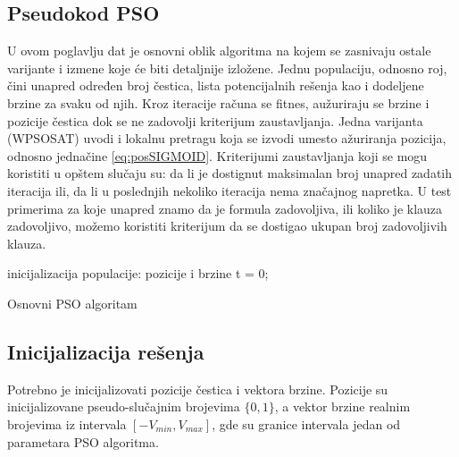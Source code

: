 \documentclass{article}
\begin{document}
 
\subsection{Pseudokod PSO}
\label{sec:pso_pseudokod}

U ovom poglavlju dat je osnovni oblik algoritma na kojem se zasnivaju ostale varijante i izmene koje će biti detaljnije izložene. Jednu populaciju, odnosno roj, čini unapred određen broj čestica, lista potencijalnih rešenja kao i dodeljene brzine za svaku od njih. 
Kroz iteracije računa se fitnes, aužuriraju se brzine i pozicije čestica dok se ne zadovolji kriterijum zaustavljanja. 
Jedna varijanta (WPSOSAT) uvodi i lokalnu pretragu koja se izvodi umesto ažuriranja pozicija, odnosno jednačine \ref{eq:posSIGMOID}.
Kriterijumi zaustavljanja koji se mogu koristiti u opštem slučaju su: da li je dostignut maksimalan broj unapred zadatih iteracija ili, da li u poslednjih nekoliko iteracija nema značajnog napretka.
U test primerima za koje unapred znamo da je formula zadovoljiva, ili koliko je klauza zadovoljivo, možemo koristiti kriterijum da se dostigao ukupan broj zadovoljivih klauza. \\

\begin{algorithm}[H]
\SetAlgoLined
{}

\BlankLine
 inicijalizacija populacije: pozicije i brzine\;
 t = 0; \\
\caption{Osnovni PSO algoritam}
\end{algorithm}


\subsection{Inicijalizacija rešenja}
\label{sec:pso_init}

Potrebno je inicijalizovati pozicije čestica i vektora brzine. Pozicije su inicijalizovane pseudo-slučajnim brojevima $\{0,1\}$, a vektor brzine realnim brojevima iz intervala $[-V_{min}, V_{max}]$, gde su granice intervala jedan od parametara PSO algoritma.
\end{document}
